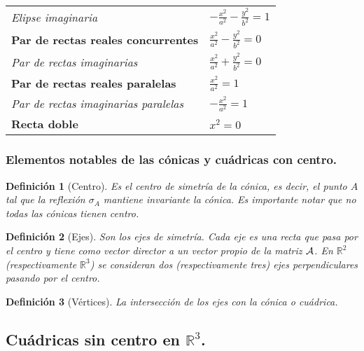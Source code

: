 \documentclass[11pt, a4paper]{article}
\newif\IfInSansMode
\theoremstyle{theorem-style}
\theoremstyle{definition-style}
\newtheorem{ndef}{Definición}[section]
\theoremstyle{remark-style}
\theoremstyle{example-style}
\begin{document}
\begin{tabular}{ll}
{\it Elipse imaginaria}  &
$
-\frac{{x}^2}{a^2} - \frac{{y}^2}{b^2} = 1
$
\vspace{.4cm}
\\

{\bf  Par de rectas reales concurrentes}  &
$
\frac{{x}^2}{a^2} - \frac{{y}^2}{b^2}=0
$
\vspace{.4cm}
\\
{\it Par de rectas imaginarias} &
$
\frac{{x}^2}{a^2} + \frac{{y}^2}{b^2}=0
$
\vspace{.4cm}
\\
{\bf  Par de rectas reales paralelas}  &
$
\frac{{x}^2}{a^2}=1
$
\vspace{.4cm}
\\
{\it Par de rectas imaginarias paralelas}  &
$
-\frac{{x}^2}{a^2} = 1
$
\vspace{.4cm}
\\
{\bf  Recta doble}  &
$
{{x}^2} = 0
$
\vspace{.3cm}
\\
\end{tabular}
\subsubsection{\bf  Elementos notables de las c\'onicas y cu\'adricas con centro.}

\begin{ndef}[Centro]
	Es el centro de simetría de la cónica, es decir, el punto $A$ tal que la reflexión $\sigma_A$ mantiene invariante la cónica. Es importante notar que no todas las cónicas tienen centro.
\end{ndef}


\begin{ndef}[Ejes]
	 Son los ejes de simetr\'ia. Cada eje es una recta que pasa por el centro y tiene como vector director a un vector propio de la matriz $\cal A$. En $\mathbb{R}^2$ (respectivamente $\mathbb{R}^3$) se consideran dos (respectivamente tres)  ejes perpendiculares pasando por el centro.
\end{ndef}

\begin{ndef}[Vértices]
	La intersecci\'on de los ejes con la c\'onica o cu\'adrica.
\end{ndef}


\subsection{\bf Cu\'adricas sin centro en $\mathbb{R}^3$.}
\end{document}
